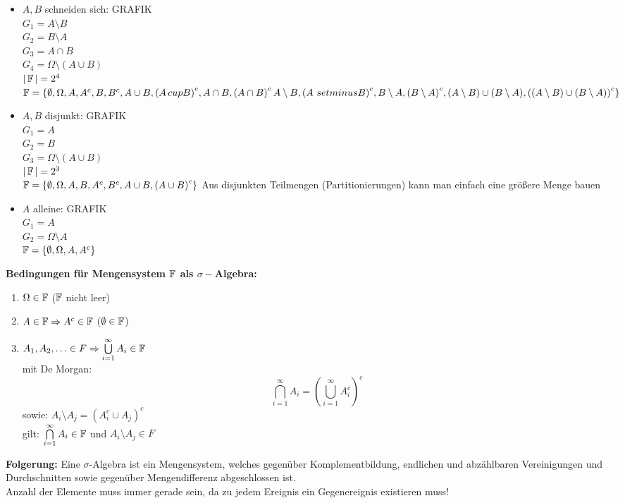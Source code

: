 \documentclass[german]{latex4ei/latex4ei_sheet}
\begin{document}
\begin{itemize}
	\item $A,B$ schneiden sich: GRAFIK\\
		$G_1=A \setminus B$\\
		$G_2=B \setminus A$\\
		$G_3=A \cap B$\\
		$G_4=\Omega \setminus (A \cup B)$\\
		$|\operatorname{\mathbb F}|=2^4$\\
		$\operatorname{\mathbb F}=\{\emptyset,\Omega,A,A^c,B,B^c,A\cup B, {(A \,cup B)}^c,A\cap B,{(A \cap B)}^c\,A\setminus B,{(A\ setminus B)}^c,B\setminus A,{(B \setminus A)}^c,(A\setminus B) \cup (B \setminus A),{((A \setminus B) \cup (B \setminus A))}^c\}$
	\item $A,B$ disjunkt: GRAFIK\\
		$G_1=A$\\
		$G_2=B$\\
	    $G_3=\Omega \setminus (A \cup B)$\\
		$|\operatorname{\mathbb F}|=2^3$\\
		$\operatorname{\mathbb F}=\{\emptyset,\Omega,A,B,A^c,B^c,A \cup B,{(A \cup B)}^c\}$
		Aus disjunkten Teilmengen (Partitionierungen) kann man einfach eine gr\"o\ss{}ere Menge bauen
	\item $A$ alleine: GRAFIK\\
		$G_1=A$\\
		$G_2=\Omega \setminus A$\\
		$\operatorname{\mathbb F}=\{\emptyset,\Omega,A,A^c\}$
\end{itemize}
\textbf{Bedingungen f\"ur Mengensystem $\operatorname{\mathbb F}$ als $\sigma-$Algebra:}\\
\begin{enumerate}
	\item $\Omega \in \operatorname{\mathbb F}$ ($\operatorname{\mathbb F}$ nicht leer)
	\item $A \in \operatorname{\mathbb F} \Rightarrow A^c \in \operatorname{\mathbb F}$ ($\emptyset \in \operatorname{\mathbb F}$)
	\item $A_1,A_2,\ldots \in F \Rightarrow \bigcup\limits_{i=1}^\infty A_i \in \operatorname{\mathbb F}$\\
		mit De Morgan:\\
		\[\bigcap\limits_{i=1}^\infty A_i={(\bigcup\limits_{i=1}^\infty A_i^c)}^c\]
		sowie: $A_i \setminus A_j={(A_i^c \cup A_j)}^c$\\
		gilt: $\bigcap\limits_{i=1}^\infty A_i \in \operatorname{\mathbb F}$ und $A_i \setminus A_j \in F$\\
\end{enumerate}
\textbf{Folgerung:} Eine $\sigma$-Algebra ist ein Mengensystem, welches gegen\"uber Komplementbildung, endlichen und abz\"ahlbaren Vereinigungen und Durchschnitten sowie gegen\"uber Mengendifferenz abgeschlossen ist.\\
Anzahl der Elemente muss immer gerade sein, da zu jedem Ereignis ein Gegenereignis existieren muss!\\
\end{document}
